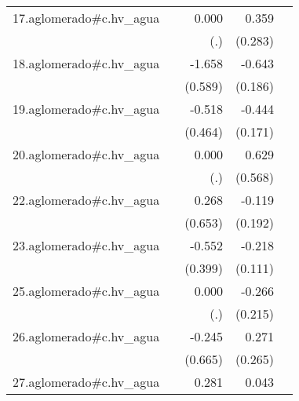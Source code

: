 {\begin{longtable}{l*{4}{D{.}{.}{-1}}}
\addlinespace
17.aglomerado#c.hv\_agua&                     &       0.000         &       0.359         &                     \\
            &                     &         (.)         &     (0.283)         &                     \\
\addlinespace
18.aglomerado#c.hv\_agua&                     &      -1.658\sym{**} &      -0.643\sym{***}&                     \\
            &                     &     (0.589)         &     (0.186)         &                     \\
\addlinespace
19.aglomerado#c.hv\_agua&                     &      -0.518         &      -0.444\sym{**} &                     \\
            &                     &     (0.464)         &     (0.171)         &                     \\
\addlinespace
20.aglomerado#c.hv\_agua&                     &       0.000         &       0.629         &                     \\
            &                     &         (.)         &     (0.568)         &                     \\
\addlinespace
22.aglomerado#c.hv\_agua&                     &       0.268         &      -0.119         &                     \\
            &                     &     (0.653)         &     (0.192)         &                     \\
\addlinespace
23.aglomerado#c.hv\_agua&                     &      -0.552         &      -0.218\sym{*}  &                     \\
            &                     &     (0.399)         &     (0.111)         &                     \\
\addlinespace
25.aglomerado#c.hv\_agua&                     &       0.000         &      -0.266         &                     \\
            &                     &         (.)         &     (0.215)         &                     \\
\addlinespace
26.aglomerado#c.hv\_agua&                     &      -0.245         &       0.271         &                     \\
            &                     &     (0.665)         &     (0.265)         &                     \\
\addlinespace
27.aglomerado#c.hv\_agua&                     &       0.281         &       0.043         &                     \\

\end{longtable}}

